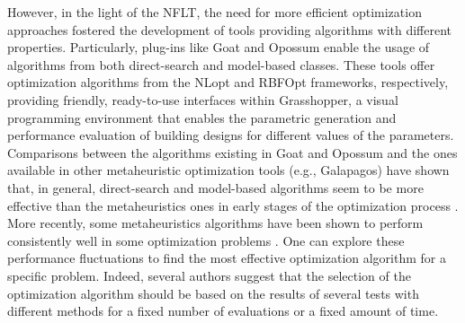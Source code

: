\begin{table}[]
		\label{table:compare-dfo-algos}	
	\end{table}
	
	
	However, in the light of the \ac{NFLT}, the need for more efficient optimization approaches fostered the development of tools providing algorithms with different properties. Particularly, plug-ins like Goat and Opossum enable the usage of algorithms from both direct-search and model-based classes. These tools offer optimization algorithms from the NLopt and RBFOpt frameworks, respectively, providing friendly, ready-to-use interfaces within Grasshopper, a visual programming environment that enables the parametric generation and performance evaluation of building designs for different values of the parameters. Comparisons between the algorithms existing in Goat and Opossum and the ones available in other metaheuristic optimization tools (e.g., Galapagos) have shown that, in general, direct-search and model-based algorithms seem to be more effective than the metaheuristics ones in early stages of the optimization process \cite{Wortmann2017,Wortmann2017GABESTCHOICE}. More recently, some metaheuristics algorithms have been shown to perform consistently well in some optimization problems \cite{Waibel2018}. One can explore these performance fluctuations to find the most effective optimization algorithm for a specific problem. Indeed, several authors suggest that the selection of the optimization algorithm should be based on the results of several tests with different methods for a fixed number of evaluations or a fixed amount of time\cite{Hamdy2016, Wortmann2016BBO}. 
		
